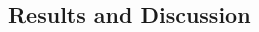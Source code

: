 \documentclass[12pt, English]{article}
\begin{document}
\begin{spacing}{1.9}
\section{Results and Discussion}\label{sec3}


\begin{comment}

The estimation of the ratio of the contemporary effective population size to the census size ($N_{\rm e}/N$) has attracted much research attention for providing information about a current population, especially in the context of conservation biology and wildlife management \cite[]{Palstra_2012,FRANKHAM201456}. Small $N_{\rm e}/N$ demonstrates large variance in reproductive success \cite[]{Wang:2016aa, JFB:JFB13143, Akita_2019}, resulting from the variance of reproductive potential \cite[e.g., the big old fat fecund female fish hypothesis;][]{Hixon_2014} or from the situation in which only some families successfully reproduce \cite[referred to as the ``Sweepstakes reproductive success'' hypothesis,][]{hedgecock2011sweepstakes}. Moreover, if $N_{\rm e}/N$ is invariant across years, then $N_{\rm e}$ may behave like an index of $N$, and vice versa \cite[]{luikart2010estimation}. However, if $N_{\rm e}/N$ fluctuates across years, the trends can clarify the interpretation of environmental and/or anthropological factors, causing the variance of reproductive potential, family-correlated survivorship, or fluctuating population dynamics. Besides, low precision and/or large bias for estimating $N_{\rm e}/N$ may lead to a wrong interpretation of the population \cite[]{Tallmon:2012aa}.

The estimation of $N_{\rm e}/N$ has been performed by utilizing the estimated values of contemporary effective population size ($N_{\rm e}$) and census size ($N$), unless complete pedigree data and/or full census data are available. Additionally, there are numerous methods for estimating $N_{\rm e}$ from genetic markers \cite[][and the references contained therein]{Wang:2016aa}. There are also numerous methods for estimating $N$, such as a mark-recapture method or population dynamics modeling with survey data \cite[e.g.,][]{seber1982estimation,quinn1999quantitative,kery2011bayesian,methot2013stock}. It is known that there are large variations in both estimators; thus, their combination (i.e., the estimator of $N_{\rm e}/N$) also shows large variation \cite[]{Palstra_2012,Marandel_2018}. There is currently a little theoretical foundation for the estimator of $N_{\rm e}/N$, indicating no guidance for a sample size to ensure the required accuracy and precision. 


\end{comment}
\end{spacing}
\end{document}
